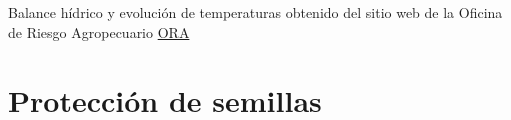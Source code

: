 \documentclass[
  letterpaper,
  DIV=11,
  numbers=noendperiod]{scrreprt}
\begin{document}
Balance hídrico y evolución de temperaturas obtenido del sitio web de la
Oficina de Riesgo Agropecuario
\href{http://www.ora.gob.ar/camp_actual_reservas.php}{ORA}


\hypertarget{protecciuxf3n-de-semillas}{%
\chapter{Protección de semillas}\label{protecciuxf3n-de-semillas}}

 
  \providecommand{\huxb}[2]{\arrayrulecolor[RGB]{#1}\global\arrayrulewidth=#2pt}
  \providecommand{\huxvb}[2]{\color[RGB]{#1}\vrule width #2pt}
  \providecommand{\huxtpad}[1]{\rule{0pt}{#1}}
  \providecommand{\huxbpad}[1]{\rule[-#1]{0pt}{#1}}
\end{document}
